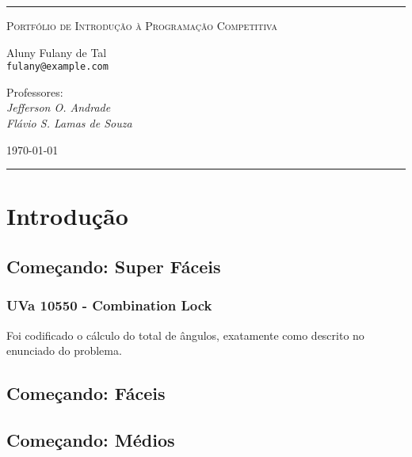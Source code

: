 \documentclass[11pt]{scrartcl}
\begin{document}
\vspace*{\fill}

\hrule
\begin{center}
\Huge
\textsc{Portfólio de Introdução à Programação Competitiva}

\medskip
\Large
Aluny Fulany de Tal\\
\large
\texttt{fulany@example.com}

\bigskip

Professores:\\
\emph{Jefferson O. Andrade}\\
\emph{Flávio S. Lamas de Souza}

\bigskip

\today
\end{center}
\hrule

\vspace*{\fill}
\thispagestyle{empty}

\newpage

\setcounter{tocdepth}{2}
\tableofcontents

\newpage


\section{Introdução}

\subsection{Começando: Super Fáceis}

\subsubsection{UVa 10550 - Combination Lock}

Foi codificado o cálculo do total de ângulos, exatamente como descrito
no enunciado do problema.



\subsection{Começando: Fáceis}

\subsection{Começando: Médios}
\end{document}

